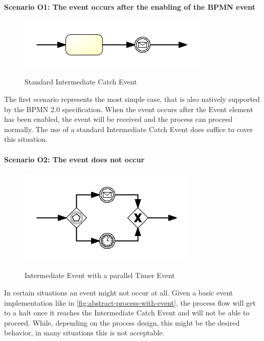 \paragraph{Scenario O1: The event occurs after the enabling of the BPMN event}
\begin{figure}[]
	\myfloatalign
	{\includegraphics[width=1\linewidth]{chapters/assessment/standard-intermediate-event.png}}
	\caption{Standard Intermediate Catch Event}\label{fig:excerpt-standard-event}
\end{figure}

The first scenario represents the most simple case, that is also natively supported by the BPMN 2.0 specification. When the event occurs after the Event element has been enabled, the event will be received and the process can proceed normally. The use of a standard Intermediate Catch Event does suffice to cover this situation.

\paragraph{Scenario O2: The event does not occur}
\begin{figure}[]
	\myfloatalign
	{\includegraphics[width=1\linewidth]{chapters/assessment/parallel-timer-event.png}}
	\caption{Intermediate Event with a parallel Timer Event}\label{fig:excerpt-event-with-timer}
\end{figure}

In certain situations an event might not occur at all. Given a basic event implementation like in \autoref{fig:abstract-process-with-event}, the process flow will get to a halt once it reaches the Intermediate Catch Event and will not be able to proceed. While, depending on the process design, this might be the desired behavior, in many situations this is not acceptable.

